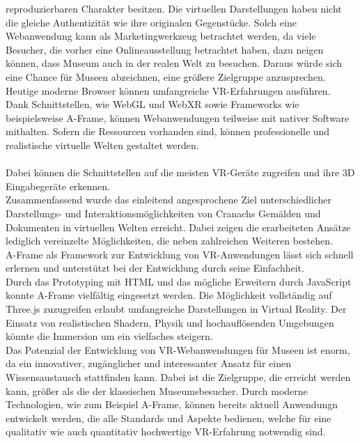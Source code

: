 \documentclass[a4paper,12pt,oneside]{article}
\begin{document}
    reproduzierbaren Charakter besitzen. Die virtuellen Darstellungen
    haben nicht die gleiche Authentizität wie ihre originalen Gegenstücke.
    Solch eine Webanwendung kann als Marketingwerkzeug betrachtet
    werden, da viele Besucher, die vorher eine Onlineausstellung
    betrachtet haben, dazu neigen können, dass Museum auch in der realen
    Welt zu besuchen. Daraus würde sich eine Chance für Museen abzeichnen, 
    eine größere Zielgruppe anzusprechen. \\
    Heutige moderne Browser können umfangreiche VR-Erfahrungen ausführen.
    Dank Schnittstellen,
    wie WebGL und WebXR sowie Frameworks wie beispielsweise A-Frame, 
    können Webanwendungen teilweise mit nativer Software mithalten. 
    Sofern die Ressourcen
    vorhanden sind, können professionelle und realistische virtuelle
    Welten gestaltet werden.  \\ \\
    Dabei können die Schnittstellen auf
    die meisten VR-Geräte zugreifen und ihre 3D Eingabegeräte erkennen. \\
    Zusammenfassend wurde das einleitend angesprochene Ziel 
    unterschiedlicher
    Darstellungs- und Interaktionsmöglichkeiten von Cranachs 
    Gemälden und Dokumenten in virtuellen Welten erreicht.
    Dabei zeigen die erarbeiteten Ansätze
    lediglich vereinzelte Möglichkeiten, die neben zahlreichen
    Weiteren bestehen. \\
    A-Frame als Framework zur Entwicklung von VR-Anwendungen 
    lässt sich schnell erlernen und unterstützt bei der 
    Entwicklung durch seine Einfachheit. \\
    Durch das Prototyping mit HTML und das mögliche Erweitern durch 
    JavaScript konnte A-Frame vielfältig eingesetzt werden.
    Die Möglichkeit vollständig auf Three.js zuzugreifen 
    erlaubt umfangreiche Darstellungen in Virtual Reality.
    Der Einsatz von realistischen Shadern, Physik und 
    hochauflösenden Umgebungen könnte
    die Immersion um ein vielfaches steigern. \\
    Das Potenzial der Entwicklung von VR-Webanwendungen für Museen
    ist enorm, da ein innovativer, zugänglicher und interessanter 
    Ansatz für  einen Wissensaustausch stattfinden kann. 
    Dabei ist die Zielgruppe, die erreicht werden kann,
    größer als die der klassischen Museumsbesucher.
    Durch moderne Technologien, wie zum Beispiel A-Frame,
    können bereits aktuell Anwendungn entwickelt werden, die alle
    Standards und Aspekte bedienen, welche für eine qualitativ
    wie auch quantitativ hochwertige VR-Erfahrung notwendig sind.
\end{document}
